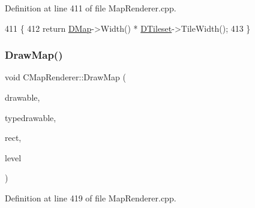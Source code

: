 Definition at line 411 of file Map\+Renderer.\+cpp.


\begin{DoxyCode}
411                                         \{
412     \textcolor{keywordflow}{return} \hyperlink{classCMapRenderer_ab9a199c61aa1c87a3248af3085d8ba52}{DMap}->Width() * \hyperlink{classCMapRenderer_ace0648cba050b5e02431096edd15b836}{DTileset}->TileWidth();
413 \}
\end{DoxyCode}
\hypertarget{classCMapRenderer_a26786befd5d6d0b09210736916d1b912}{}\label{classCMapRenderer_a26786befd5d6d0b09210736916d1b912} 
\subsubsection{\texorpdfstring{Draw\+Map()}{DrawMap()}}
{\footnotesize\ttfamily void C\+Map\+Renderer\+::\+Draw\+Map (\begin{DoxyParamCaption}\item[{Gdk\+Drawable $\ast$}]{drawable,  }\item[{Gdk\+Drawable $\ast$}]{typedrawable,  }\item[{const \hyperlink{structSRectangle}{S\+Rectangle} \&}]{rect,  }\item[{int}]{level }\end{DoxyParamCaption})}



Definition at line 419 of file Map\+Renderer.\+cpp.


